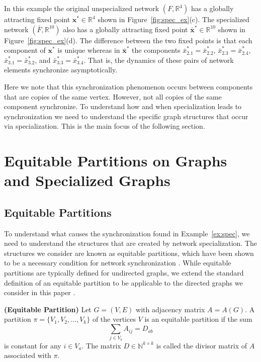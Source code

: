 \documentclass[12pt]{thesis}
\begin{document}
\begin{example}
In this example the original unspecialized network $(F,\mathbb{R}^4)$ has a globally attracting fixed point $\mathbf{x}^*\in\mathbb{R}^4$ shown in Figure~\ref{fig:spec_ex}(c).
The specialized network $(\bar{F},\mathbb{R}^{10})$ also has a globally attracting fixed point $\bar{\mathbf{x}}^*\in\mathbb{R}^{10}$ shown in Figure~\ref{fig:spec_ex}(d).
The difference between the two fixed points is that each component of $\mathbf{x}^*$ is unique whereas in $\bar{\mathbf{x}}^*$ the components $\bar{x}_{2.1}^*=\bar{x}_{2.2}^*$, $\bar{x}_{2.3}^*=\bar{x}_{2.4}^*$, $\bar{x}_{3.1}^*=\bar{x}_{3.2}^*$, and $\bar{x}_{3.3}^*=\bar{x}_{3.4}^*$.
That is, the dynamics of these pairs of network elements {synchronize asymptotically}.
\end{example}

Here we note that this synchronization phenomenon occurs between components that are copies of the same vertex.
However, not all copies of the same component synchronize.
To understand how and when specialization leads to synchronization we need to understand the specific graph structures that occur via specialization.
This is the main focus of the following section.


\chapter{Equitable Partitions on Graphs and Specialized Graphs}\label{chapt:eqp}

\section{Equitable Partitions}

To understand what causes the synchronization found in Example~\ref{ex:spec}, we need to understand the structures that are created by network specialization.
The structures we consider are known as equitable partitions, which have been shown to be a necessary condition for network synchronization \cite{11}.
While equitable partitions are typically defined for undirected graphs, we extend the standard definition of an equitable partition to be applicable to the directed graphs we consider in this paper \cite{Godsil01}.

\begin{definition}\label{def:ep}\textbf{(Equitable Partition)}
Let $G=(V,E)$ with adjacency matrix $A=A(G)$.
A partition $\pi=\{V_1,V_2,\dots,V_k\}$ of the vertices $V$ is an equitable partition if the sum
\begin{equation}\label{eq:ep}
    \sum_{j\in V_b}A_{ij}=D_{ab}    
\end{equation}
is constant for any $i\in V_a$.
The matrix $D\in\mathbb{N}^{k\times k}$ is called the {divisor matrix} of $A$ associated with $\pi$. 
\end{definition}
\end{document}
